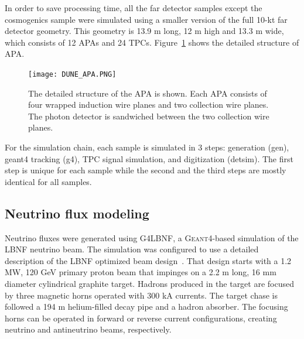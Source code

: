 In order to save processing time, all the far detector samples except the cosmogenics sample were simulated using a smaller version of the full 10-kt far detector geometry. This geometry is 13.9 m long, 12 m high and 13.3 m wide, which consists of 12 APAs and 24 TPCs. %
Figure~\ref{fig:dune_apa} shows the detailed structure of APA. %

\begin{figure}[!ht]
\centering
\texttt{[image: DUNE\_APA.PNG]}
\caption{The detailed structure of the APA is shown. Each APA consists of four wrapped induction wire planes and two collection wire planes.
The photon detector is sandwiched between the two collection wire planes.}
\label{fig:dune_apa}
\end{figure}

For the simulation chain, each sample is simulated in 3 steps: generation (gen), {\sc geant4} tracking (g4), TPC signal simulation, and digitization (detsim). The first step is unique for each sample while the second and the third steps are mostly identical for all samples. 

\subsection{Neutrino flux modeling}
\label{sec:tools-mc-flux}

Neutrino fluxes were generated using G4LBNF, a \textsc{Geant}4\xspace-based simulation of the LBNF neutrino beam.  The simulation was configured to use a detailed description of the LBNF optimized beam design~\cite{optimizedbeamcdr}.  That design starts with a 1.2 MW, 120 GeV primary proton beam that impinges on a 2.2 m long, 16 mm diameter cylindrical graphite target.  Hadrons produced in the target are focused by three magnetic horns operated with 300 kA currents.  The target chase is followed a 194 m helium-filled decay pipe and a hadron absorber.  The focusing horns can be operated in forward or reverse current configurations, creating neutrino and antineutrino beams, respectively.   

